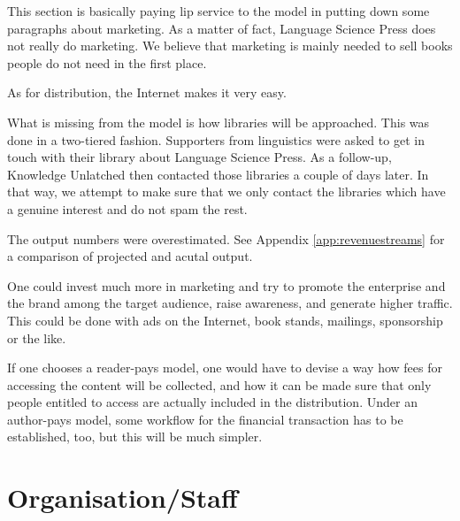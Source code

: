 \documentclass[nonflat,smallfont
]{langsci/langscibook}
\newcommand{\evaluation}[1]{
  \renewcommand{\tblslinecolour}{lsLightOrange}
  \tblssy{receipt}{Evaluation}{\vspace*{-5mm}#1}
}
\newcommand{\othersolutions}[1]{
  \renewcommand{\tblslinecolour}{lsDarkGreenOne}
  \tblssy{more}{Other solutions}{\vspace*{-5mm}#1}
}
\renewcommand{\tblssy}[4][black!12]{%
  \renewcommand{\langscisymbol}{#2}\renewcommand{\tblsboxcolor}{#1}
  \begin{mdframed}[style=yellowexercise,frametitle={#3}]
    #4
  \end{mdframed}
}
\begin{document}
\evaluation{
This section is basically paying lip service to the model in putting down some paragraphs about marketing. As a matter of fact, Language Science Press does not really do marketing. We believe that marketing is mainly needed to sell books people do not need in the first place. 

As for distribution, the Internet makes it very easy.

What is missing from the model is how libraries will be approached. This was done in a two-tiered fashion. Supporters from linguistics were asked to get in touch with their library about Language Science Press. As a follow-up, Knowledge Unlatched then contacted those libraries a couple of days later. In that way, we attempt to make sure that we only contact the libraries which have a genuine interest and do not spam the rest.

The output numbers were overestimated. See Appendix \ref{app:revenuestreams} for a comparison of projected and acutal output. 
}
\othersolutions{ 
One could invest much more in marketing and try to promote the enterprise and the brand among the target audience, raise awareness, and generate higher traffic. This could be done with ads on the Internet, book stands, mailings, sponsorship or the like. 

If one chooses a reader-pays model, one would have to devise a way how fees for accessing the content will be collected, and how it can be made sure that only people entitled to access are actually included in the distribution.  Under an author-pays model, some workflow for the financial transaction has to be established, too, but this will be much simpler. 
}

\chapter{Organisation\slash Staff}
\end{document}
